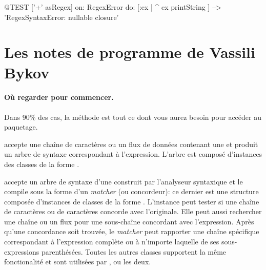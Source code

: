 \documentclass[a4paper,10pt,twoside]{book}
\begin{document}
{\begin{itemize}

\end{itemize}


\begin{code}{@TEST}
['+' asRegex] on: RegexError do: [:ex | ^ ex printString ]                                        --> 'RegexSyntaxError:  nullable closure'
\end{code}
\section{Les notes de programme de Vassili Bykov}

\paragraph{Où regarder pour commencer.}
Dans 90\% des cas, la méthode  est tout
ce dont vous aurez besoin pour accéder au paquetage.

 accepte une chaîne de caractères ou un flux de
données contenant une \expreg et produit un arbre de syntaxe
correspondant à l'expression. L'arbre est composé d'instances des
classes de la forme .

 accepte un arbre de syntaxe d'une \expreg construit
par l'analyseur syntaxique et le compile sous la forme d'un
\emph{matcher} (ou concordeur): ce dernier est une structure composée
d'instances de classes de la forme . 
L'instance  peut tester si une chaîne de caractères
ou  %
de caractères concorde avec l'\expreg originale. Elle peut aussi
rechercher une chaîne ou un flux pour une sous-chaîne concordant avec
l'expression. Après qu'une concordance soit trouvée, le \emph{matcher}
peut rapporter une chaîne spécifique correspondant à l'expression
complète ou à n'importe laquelle de ses sous-expressions parenthésées.
Toutes les autres classes supportent la même fonctionalité et sont
utilisées par ,  ou les deux.

}
\end{document}
